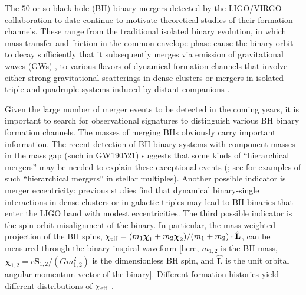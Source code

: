 \documentclass[
        fleqn,
        usenatbib,
    ]{mnras}
\newcommand*{\uv}[1]{\hat{\mathbf{#1}}}
\begin{document}
The $50$ or so black hole (BH) binary mergers detected by the LIGO/VIRGO
collaboration to date \citep{LIGOO3a} continue to motivate theoretical studies of their
formation channels. These range from the traditional isolated binary evolution,
in which mass transfer and friction in the common envelope phase cause the
binary orbit to decay sufficiently that it subsequently merges via emission of
gravitational waves (GWs) \citep[e.g.,][]{lipunov1997black,
lipunov2017first, podsiadlowski2003formation, belczynski2010effect,
belczynski2016first, dominik2012double, dominik2013double, dominik2015double},
to various flavors of dynamical formation channels that involve either strong
gravitational scatterings in dense clusters \citep[e.g.,][]{zwart1999black,
o2006binary, miller2009mergers, banerjee2010stellar, downing2010compact,
ziosi2014dynamics, rodriguez2015binary, samsing2017assembly, samsing2018black,
rodriguez2018post, gondan2018eccentric} or mergers in isolated triple and
quadruple systems induced by distant companions \citep[e.g.,][]{miller2002four,
wen2003eccentricity, antonini2012secular, antonini2017binary, silsbee2017lidov,
LL17, LL18, randall2018induced, hoang2018black, fragione2019, fragione2019loeb,
bin_misc5, LL19, LLW_apjl, bin_misc2, bin_misc1}.

Given the large number of merger events to be detected in the coming years, it
is important to search for observational signatures to distinguish various BH
binary formation channels. The masses of merging BHs obviously carry important
information. The recent detection of BH binary systems with component masses in
the mass gap (such in GW190521) suggests that some kinds of ``hierarchical
mergers'' may be needed to explain these exceptional events (\citealp{190521};
see \citealp{bin_misc1} for examples of such ``hierarchical mergers'' in stellar
multiples). Another possible indicator is merger eccentricity: previous
studies find that dynamical binary-single interactions in dense clusters
\citep[e.g.,][]{samsing2017assembly, rodriguez2018post, samsing2018black,
fragione2019bromberg} or in galactic triples \citep{silsbee2017lidov,
antonini2017binary, fragione2019loeb, LL19} may lead to BH binaries that enter
the LIGO band with modest eccentricities. The third possible indicator is the
spin-orbit misalignment of the binary. In particular, the mass-weighted
projection of the BH spins, $\chi_{\rm eff} = (m_1 \boldsymbol{\chi}_1 +
m_2\boldsymbol{\chi}_2) / (m_1 + m_2) \cdot \uv{L}$, can be measured through the
binary inspiral waveform [here, $m_{1,2}$ is the BH mass,
$\boldsymbol{\chi}_{1,2} = c\boldsymbol{S}_{1,2} / (Gm_{1,2}^2)$ is the
dimensionless BH spin, and $\uv{L}$ is the unit orbital angular momentum vector
of the binary]. Different formation histories yield different distributions of
$\chi_{\rm eff}$ \citep{LL17, LL18, antonini2018precessional, rodriguez2018post,
gerosa2018, LL19, su2020spin}.
\end{document}
